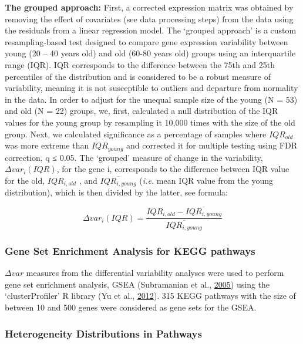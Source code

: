 \documentclass[12pt,twoside]{unicam}
\begin{document}
\textbf{The grouped approach:} First, a corrected expression matrix was obtained by removing the effect of covariates (see data processing steps) from the data using the residuals from a linear regression model. The `grouped approach' is a custom resampling-based test designed to compare gene expression variability between young (20 -- 40 years old) and old (60-80 years old) groups using an interquartile range (IQR). IQR corresponds to the difference between the 75th and 25th percentiles of the distribution and is considered to be a robust measure of variability, meaning it is not susceptible to outliers and departure from normality in the data. In order to adjust for the unequal sample size of the young (N = 53) and old (N = 22) groups, we, first, calculated a null distribution of the IQR values for the young group by resampling it 10,000 times with the size of the old group. Next, we calculated significance as a percentage of samples where \(IQR_{old}\) was more extreme than \(IQR_{young}\) and corrected it for multiple testing using FDR correction, q ≤ 0.05. The `grouped' measure of change in the variability, \(\Delta var_i(IQR)\), for the gene i, corresponds to the difference between IQR value for the old, \(IQR_{i,old}\) , and \(\overline{IQR_{i,young}}\) (\emph{i.e.} mean IQR value from the young distribution), which is then divided by the latter, see formula:

\[\Delta var_i(IQR) = \dfrac{IQR_{i,old} - \overline{IQR_{i,young}}}{\overline{IQR_{i,young}}}\]

\hypertarget{gene-set-enrichment-analysis-for-kegg-pathways}{%
\subsubsection{Gene Set Enrichment Analysis for KEGG pathways}\label{gene-set-enrichment-analysis-for-kegg-pathways}}

\(\Delta var\) measures from the differential variability analyses were used to perform gene set enrichment analysis, GSEA (Subramanian et al., \protect\hyperlink{ref-Subramanian2005}{2005}) using the `clusterProfiler' R library (Yu et al., \protect\hyperlink{ref-Yu2012}{2012}). 315 KEGG pathways with the size of between 10 and 500 genes were considered as gene sets for the GSEA.

\hypertarget{heterogeneity-distributions-in-pathways}{%
\subsubsection{Heterogeneity Distributions in Pathways}\label{heterogeneity-distributions-in-pathways}}
\end{document}
